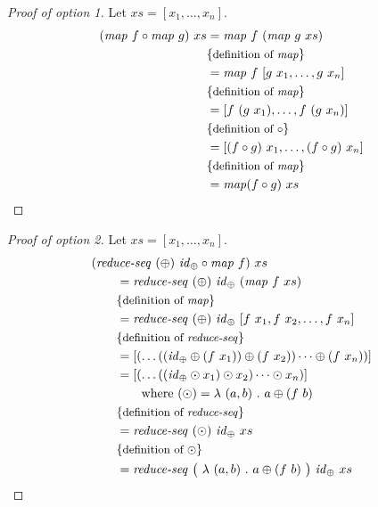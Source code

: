 \begin{proof}[Proof of option 1]
  Let $xs = [x_1, \ldots, x_n]$.
  \begin{align*}
    (\text{\textit{map}}\ f\circ \text{\textit{map}}\ g)\ xs
      &= \text{\textit{map}}\ f\ (\text{\textit{map}}\ g\ xs)\\
      &\{\text{\small definition of \text{\textit{map}}}\}\\
      &= \text{\textit{map}}\ f\ [g\ x_1, \ldots, g\ x_n]\\
      &\{\text{\small definition of \text{\textit{map}}}\}\\
      &= [f\ (g\ x_1), \ldots, f\ (g\ x_n)]\\
      &\{\text{\small definition of $\circ$}\}\\
      &= [(f\circ g)\ x_1, \ldots, (f\circ g)\ x_n]\\
      &\{\text{\small definition of \text{\textit{map}}}\}\\
      &= \text{\textit{map}} (f\circ g)\ xs
  \end{align*}
\end{proof}
\begin{proof}[Proof of option 2]
  Let $xs = [x_1, \ldots, x_n]$.
  \begin{align*}
    &(\reduceSeq\ (\oplus)\ \id_\oplus \circ \map\ f)\ xs\\
    &\qquad = \reduceSeq\ (\oplus)\ \id_\oplus\ (\map\ f\ xs)\\
    &\qquad \comment{definition of \map}\\
    &\qquad = \reduceSeq\ (\oplus)\ \id_\oplus\ [f\ x_1, f\ x_2, \ldots, f\ x_n]\\
    &\qquad \comment{definition of \reduceSeq}\\
    &\qquad = [ (\dots ((\id_\oplus \oplus (f\ x_1)) \oplus (f\ x_2)) \dots \oplus (f\ x_n)) ]\\
    &\qquad = [ (\dots ((\id_\oplus \odot x_1) \odot x_2) \dots \odot x_n) ]\\
    &\qquad\qquad \text{where } (\odot) = \lambda\ (a,b)\ .\ a \oplus (f\ b)\\
    &\qquad \comment{definition of \reduceSeq}\\
    &\qquad = \reduceSeq\ (\odot)\ \id_\oplus\ xs\\
    &\qquad \comment{definition of $\odot$}\\
    &\qquad = \reduceSeq\ \big(\ \lambda\ (a,b)\ .\ a \oplus (f\ b)\ \big)\ \id_\oplus\ xs
  \end{align*}
\end{proof}






